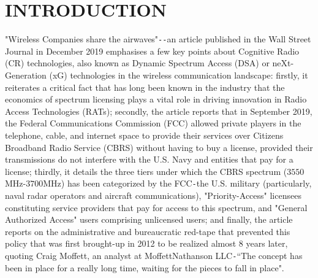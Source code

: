 %
%
%


\chapter{INTRODUCTION}\label{A}
"Wireless Companies share the airwaves"\texttt{-{}-}an article \cite{WSJ:CBRS} published in the Wall Street Journal in December 2019 emphasises a few key points about Cognitive Radio (CR) technologies, also known as Dynamic Spectrum Access (DSA) or neXt-Generation (xG) technologies in the wireless communication landscape: firstly, it reiterates a critical fact that has long been known in the industry that the economics of spectrum licensing plays a vital role in driving innovation in Radio Access Technologies (RATs); secondly, the article reports that in September 2019, the Federal Communications Commission (FCC) allowed private players in the telephone, cable, and internet space to provide their services over Citizens Broadband Radio Service (CBRS) without having to buy a license, provided their transmissions do not interfere with the U.S. Navy and entities that pay for a license; thirdly, it details the three tiers under which the CBRS spectrum ($3550$MHz-$3700$MHz) has been categorized by the FCC\texttt{-}the U.S. military (particularly, naval radar operators and aircraft communications), "Priority-Access" licensees constituting service providers that pay for access to this spectrum, and "General Authorized Access" users comprising unlicensed users; and finally, the article reports on the administrative and bureaucratic red-tape that prevented this policy that was first brought-up in 2012 to be realized almost 8 years later, quoting Craig Moffett, an analyst at MoffettNathanson LLC\texttt{-}``The concept has been in place for a really long time, waiting for the pieces to fall in place".

